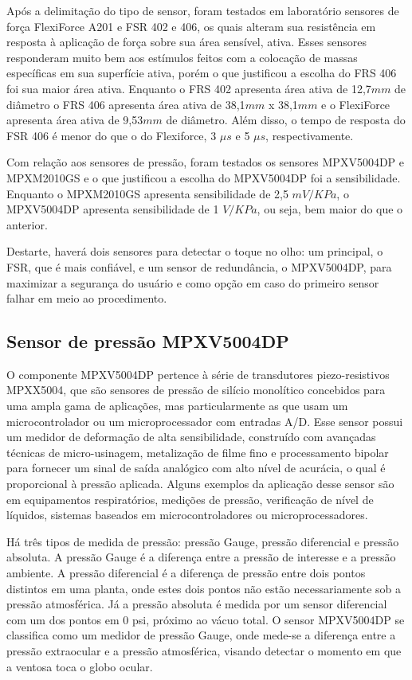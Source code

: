 Após a delimitação do tipo de sensor, foram testados em laboratório sensores de força FlexiForce A201 e FSR 402 e 406, os quais alteram sua resistência em resposta à aplicação de força sobre sua área sensível, ativa. Esses sensores responderam muito bem aos estímulos feitos com a colocação de massas específicas em sua superfície ativa, porém o que  justificou a escolha do FRS 406 foi sua maior área ativa. Enquanto o FRS 402 apresenta área ativa de 12,7$mm$ de diâmetro o FRS 406 apresenta área ativa de 38,1$mm$ x 38,1$mm$ e o FlexiForce apresenta área ativa de 9,53$mm$ de diâmetro. Além disso, o tempo de resposta do FSR 406 é menor do que o do Flexiforce, 3 $\mu s$ e 5 $\mu s$, respectivamente.

Com relação aos sensores de pressão, foram testados os sensores MPXV5004DP e MPXM2010GS e o que justificou a escolha do MPXV5004DP foi a sensibilidade. Enquanto o MPXM2010GS apresenta sensibilidade de 2,5 $mV/KPa$, o MPXV5004DP apresenta sensibilidade de 1 $V/KPa$, ou seja, bem maior do que o anterior.

Destarte, haverá dois sensores para detectar o toque no olho: um principal, o FSR, que é mais confiável, e um sensor de redundância, o MPXV5004DP, para maximizar a segurança do usuário e como opção em caso do primeiro sensor falhar em meio ao procedimento. 

\subsection[Sensor de pressão MPXV5004DP]{Sensor de pressão MPXV5004DP}

O componente MPXV5004DP pertence à série de transdutores piezo-resistivos MPXX5004, que são sensores de pressão de silício monolítico concebidos para uma ampla gama de aplicações, mas particularmente as que usam um microcontrolador ou um microprocessador com entradas A/D. Esse sensor possui um medidor de deformação de alta sensibilidade, construído com avançadas técnicas de micro-usinagem, metalização de filme fino e processamento bipolar para fornecer um sinal de saída analógico com alto nível de acurácia, o qual é proporcional à pressão aplicada. Alguns exemplos da aplicação desse sensor são em equipamentos respiratórios, medições de pressão, verificação de nível de líquidos, sistemas baseados em microcontroladores ou microprocessadores.

Há três tipos de medida de pressão: pressão Gauge, pressão diferencial e pressão absoluta. A pressão Gauge é a diferença entre a pressão de interesse e a pressão ambiente. A pressão diferencial é a diferença de pressão entre dois pontos distintos em uma planta, onde estes dois pontos não estão necessariamente sob a pressão atmosférica. Já a pressão absoluta é medida por um sensor diferencial com um dos pontos em 0 psi, próximo ao vácuo total. O sensor MPXV5004DP se classifica como um medidor de pressão Gauge, onde mede-se a diferença entre a pressão extraocular e a pressão atmosférica, visando detectar o momento em que a ventosa toca o globo ocular.

